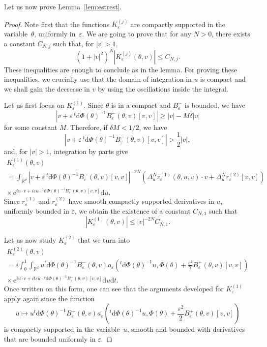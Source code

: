 \documentclass[AHL,Unicode,longabstracts]{cedram}
\newcommand*\R{{\mathbb R}}
\newcommand*\eps{\varepsilon}
\numberwithin{equation}{section}
\newcommand{\ee}{{\mathrm e}}
\newcommand*{\dd}{\mathrm{d}}
\newcommand*{\dt}{\dd t}
\newcommand*{\du}{\dd u}
\newcommand*{\dPhi}{\dd \Phi} %
\begin{document}

Let us now prove Lemma~\ref{lem:estrest}.

\begin{proof}
Note first that the functions $K_\eps^{(j)}$ are compactly supported in the variable~$\theta$, uniformly in~$\eps$. We are going to prove that for any $N>0$, there exists a constant $C_{N,j}$ such that, for $| v|>1$,
\[
(1+|v|^2)^N \left| K_\eps^{(j)} (\theta,v)\right| \leq C_{N,j}.
\]
These inequalities are enough to conclude as in the lemma. For proving these \linebreak inequalities, we crucially use that the domain of integration in $u$ is compact and we shall gain the decrease in $v$ by using the oscillations inside the integral.


Let us first focus on $K_\eps^{(1)}$. Since $\theta$ is in a compact and $B_\eps^-$ is bounded, we have
\[
\left| v+\eps \,^t\dPhi (\theta)^{-1} B_\eps^-(\theta,v) [v,v]\right|\geq | v| -M\delta | v|
\]
for some constant $M$. Therefore, if $\delta M<1/2$, we have
\[
\left| v+\eps \,^t\dPhi (\theta)^{-1} B_\eps^-(\theta,v) [v,v]\right|> \frac{1}{2} | v|,
\]
and, for $|v|>1$, integration by parts give
\begin{multline*}
K_\eps^{(1)}(\theta,v)\\
=\int_{\R^{d}} \left| v+\eps \,^t\dPhi (\theta)^{-1} B_\eps^-(\theta,v) [v,v]\right|^{-2N}\left(\Delta^N_u r_\eps^{(1)}(\theta, u, v)\cdot v+ \Delta^N_u r_\eps^{(2)} [v,v]\right)
\\
\times\, {\ee}^{i u\cdot v +i\eps u\cdot \,^t \dPhi (\theta)^{-1} B_\eps^-{(\theta,v)[v,v]} } \du.
\end{multline*}
Since $r_\eps^{(1)}$ and $r_\eps^{(2)}$ have smooth compactly supported derivatives in $u$, uniformly bounded in $\eps$, we obtain the existence of a constant $C_{N,1}$ such that
\[
| K_\eps^{(1)}(\theta,v)| \leq |v|^{-2N} C_{N,1}.
\]


Let us now study $K_\eps^{(2)}$ that we turn into
\begin{multline*}
K_\eps^{(2)}(\theta,v)\\
=i \int_0^1\int_{\R^{d}} u {}^t\dPhi (\theta)^{-1} B_\eps ^-(\theta,v) a_\eps\left(^t \dPhi (\theta)^{-1} u,\Phi(\theta)+\frac{\eps^2}{2} B_\eps^+(\theta,v)[v,v]\right)
\\ \times \, {\ee}^{i u\cdot v
+i t \eps u\cdot \,^t \dPhi (\theta)^{-1} B_\eps^-(\theta,v)[v,v]} \du\dt.
\end{multline*}
Once written on this form, one can see that the arguments developed for $K_\eps^{(1)}$ apply again since the function
\[
u\mapsto u {}^t\dPhi (\theta)^{-1} B_\eps ^-(\theta,v) a_\eps\left(^t \dPhi (\theta)^{-1} u,\Phi(\theta)+\frac{\eps^2}{2} B_\eps^+(\theta,v)[v,v]\right)
\]
is compactly supported in the variable~$u$, smooth and bounded with derivatives that are bounded uniformly in $\eps$.
\end{proof}




\end{document}
